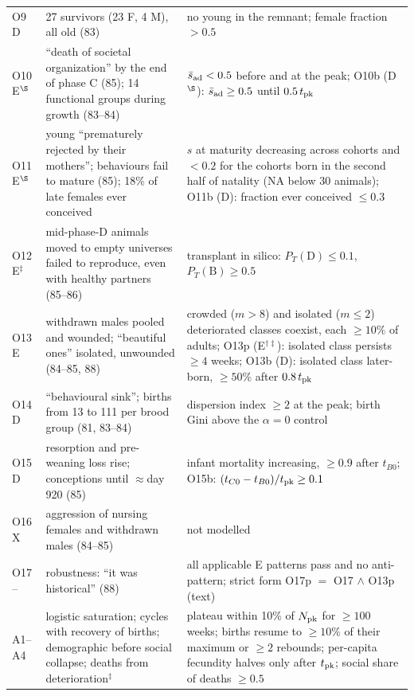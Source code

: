 \begin{table}[t]
\begin{tabular}{@{}p{1.0cm}p{7.3cm}p{8.6cm}@{}}
O9 D & 27 survivors (23 F, 4 M), all old (83) & no young in the remnant; female fraction $>0.5$ \\
O10 E$^\S$ & ``death of societal organization'' by the end of phase C (85); 14 functional groups during growth (83--84) & $\bar s_{\rm ad}<0.5$ before and at the peak; O10b (D$^\S$): $\bar s_{\rm ad}\ge0.5$ until $0.5\,t_{\rm pk}$ \\
O11 E$^\S$ & young ``prematurely rejected by their mothers''; behaviours fail to mature (85); 18\% of late females ever conceived & $s$ at maturity decreasing across cohorts and $<0.2$ for the cohorts born in the second half of natality (NA below 30 animals); O11b (D): fraction ever conceived $\le0.3$ \\
O12 E$^\ddagger$ & mid-phase-D animals moved to empty universes failed to reproduce, even with healthy partners (85--86) & transplant in silico: $P_T(\mathrm D)\le0.1$, $P_T(\mathrm B)\ge0.5$ \\
O13 E & withdrawn males pooled and wounded; ``beautiful ones'' isolated, unwounded (84--85, 88) & crowded ($m>8$) and isolated ($m\le2$) deteriorated classes coexist, each $\ge10\%$ of adults; O13p (E$^{\dagger\ddagger}$): isolated class persists $\ge4$ weeks; O13b (D): isolated class later-born, $\ge50\%$ after $0.8\,t_{\rm pk}$ \\
O14 D & ``behavioural sink''; births from 13 to 111 per brood group (81, 83--84) & dispersion index $\ge2$ at the peak; birth Gini above the $\alpha=0$ control \\
O15 D & resorption and pre-weaning loss rise; conceptions until ${\approx}$day 920 (85) & infant mortality increasing, $\ge0.9$ after $t_{B0}$; O15b: $(t_{C0}-t_{B0})/t_{\rm pk}\ge0.1$ \\
O16 X & aggression of nursing females and withdrawn males (84--85) & not modelled \\
O17 -- & robustness: ``it was historical'' (88) & all applicable E patterns pass and no anti-pattern; strict form O17p $=$ O17 $\wedge$ O13p (text) \\
\midrule
A1--A4 & logistic saturation; cycles with recovery of births; demographic before social collapse; deaths from deterioration$^\ddagger$ & plateau within 10\% of $N_{\rm pk}$ for $\ge100$ weeks; births resume to $\ge10\%$ of their maximum or $\ge2$ rebounds; per-capita fecundity halves only after $t_{\rm pk}$; social share of deaths $\ge0.5$ \\
\bottomrule
\end{tabular}
\end{table}

